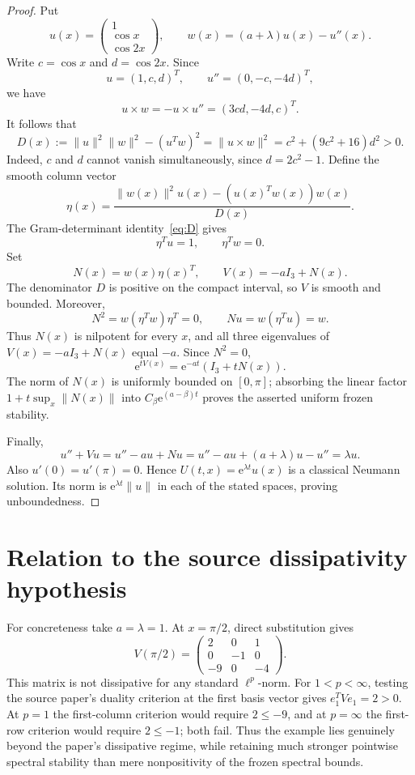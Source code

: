 \documentclass[11pt,a4paper]{article}
\newcommand{\e}{\mathrm{e}}
\begin{document}
\begin{proof}
Put
\[
 u(x)=\begin{pmatrix}1\\ \cos x\\ \cos 2x\end{pmatrix},
 \qquad
 w(x)=(a+\lambda)u(x)-u''(x).
\]
Write $c=\cos x$ and $d=\cos 2x$.  Since
\[
 u=(1,c,d)^T,
 \qquad
 u''=(0,-c,-4d)^T,
\]
we have
\[
 u\times w=-u\times u''=(3cd,-4d,c)^T.
\]
It follows that
\begin{equation}\label{eq:D}
 D(x):=\|u\|^2\|w\|^2-(u^Tw)^2
      =\|u\times w\|^2
      =c^2+(9c^2+16)d^2>0.
\end{equation}
Indeed, $c$ and $d$ cannot vanish simultaneously, since
$d=2c^2-1$.  Define the smooth column vector
\[
 \eta(x)=\frac{\|w(x)\|^2u(x)-(u(x)^Tw(x))w(x)}{D(x)}.
\]
The Gram-determinant identity~\eqref{eq:D} gives
\[
 \eta^Tu=1,
 \qquad
 \eta^Tw=0.
\]
Set
\[
 N(x)=w(x)\eta(x)^T,
 \qquad V(x)=-aI_3+N(x).
\]
The denominator $D$ is positive on the compact interval, so $V$ is smooth and
bounded.  Moreover,
\[
 N^2=w(\eta^Tw)\eta^T=0,
 \qquad Nu=w(\eta^Tu)=w.
\]
Thus $N(x)$ is nilpotent for every $x$, and all three eigenvalues of
$V(x)=-aI_3+N(x)$ equal $-a$.  Since $N^2=0$,
\[
 \e^{tV(x)}=\e^{-at}(I_3+tN(x)).
\]
The norm of $N(x)$ is uniformly bounded on $[0,\pi]$; absorbing the linear
factor $1+t\sup_x\|N(x)\|$ into $C_\beta\e^{(a-\beta)t}$ proves the asserted
uniform frozen stability.

Finally,
\[
 u''+Vu=u''-au+Nu
          =u''-au+(a+\lambda)u-u''=\lambda u.
\]
Also $u'(0)=u'(\pi)=0$.  Hence $U(t,x)=\e^{\lambda t}u(x)$ is a classical
Neumann solution.  Its norm is $\e^{\lambda t}\|u\|$ in each of the stated
spaces, proving unboundedness.
\end{proof}

\section{Relation to the source dissipativity hypothesis}

For concreteness take $a=\lambda=1$.  At $x=\pi/2$, direct substitution gives
\[
 V(\pi/2)=
 \begin{pmatrix}
 2&0&1\\
 0&-1&0\\
 -9&0&-4
 \end{pmatrix}.
\]
This matrix is not dissipative for any standard $\ell^p$-norm.  For
$1<p<\infty$, testing the source paper's duality criterion at the first basis
vector gives $e_1^TVe_1=2>0$.  At $p=1$ the first-column criterion would require
$2\le-9$, and at $p=\infty$ the first-row criterion would require $2\le-1$;
both fail.  Thus the example lies genuinely beyond the paper's dissipative
regime, while retaining much stronger pointwise spectral stability than mere
nonpositivity of the frozen spectral bounds.
\end{document}
